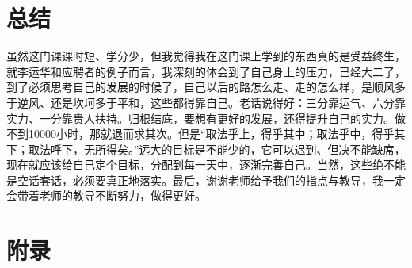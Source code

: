 \documentclass{article}
\begin{document}


\section{总结}
虽然这门课课时短、学分少，但我觉得我在这门课上学到的东西真的是受益终生，就李运华和应聘者的例子而言，我深刻的体会到了自己身上的压力，已经大二了，到了必须思考自己的发展的时候了，自己以后的路怎么走、走的怎么样，是顺风多于逆风、还是坎坷多于平和，这些都得靠自己。老话说得好：三分靠运气、六分靠实力、一分靠贵人扶持。归根结底，要想有更好的发展，还得提升自己的实力。做不到10000小时，那就退而求其次。但是“取法乎上，得乎其中；取法乎中，得乎其下；取法呼下，无所得矣。”远大的目标是不能少的，它可以迟到、但决不能缺席，现在就应该给自己定个目标，分配到每一天中，逐渐完善自己。当然，这些绝不能是空话套话，必须要真正地落实。最后，谢谢老师给予我们的指点与教导，我一定会带着老师的教导不断努力，做得更好。

\par


\section{附录}
\end{document}
